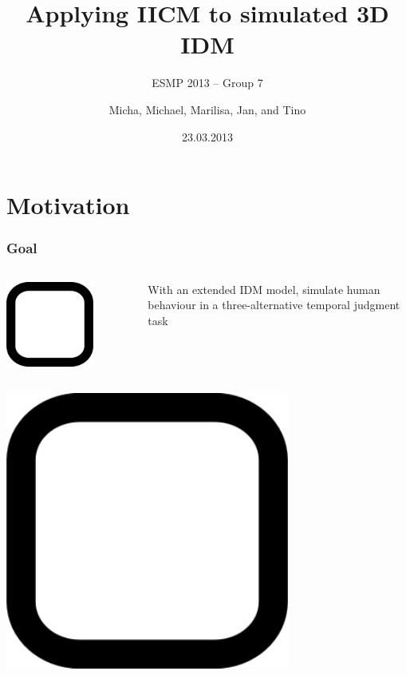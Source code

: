 \documentclass[xcolor={fixpdftex,hyperref,x11names},10pt,pdftex,hyperref={pdftex}]{beamer}
\title{Applying IICM to simulated 3D IDM}
\subtitle{ESMP 2013 -- Group 7}
\author{Micha, Michael, Marilisa, Jan, and Tino}
\institute{European Union -- Oulanka Research Station}
\date{23.03.2013}
\begin{document}
\maketitle

\section{Motivation}
\label{sec:motivation}



\begin{frame}
  \frametitle{Goal}
  \begin{columns}
  \begin{column}{0.30\textwidth}
  \includegraphics[width=0.7\textwidth]{figs/checkbox-unchecked.png}
  \end{column}
  \begin{column}{0.70\textwidth}
  With an extended IDM model, simulate human behaviour in a three-alternative temporal judgment task
  \end{column}
  \end{columns}
  \begin{columns}
  \begin{column}{0.30\textwidth}
  \includegraphics[width=0.7\textwidth]{figs/checkbox-unchecked.png}

\end{column}
\end{columns}
\end{frame}
\end{document}
